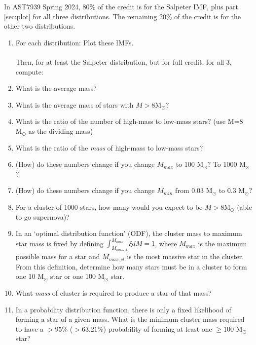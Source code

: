 \documentclass{article}
\newcommand{\msun}{\ensuremath{\mathrm{M}_\odot}\xspace}
\begin{document}
\begin{enumerate}
    In AST7939 Spring 2024, 80\% of the credit is for the Salpeter IMF, plus part \ref{sec:plot} for all three distributions.
    The remaining 20\% of the credit is for the other two distributions.

    \begin{enumerate}

        \item For each distribution: Plot these IMFs.
            \label{sec:plot}
            \\
            \\

            Then, for at least the Salpeter distribution, but for full credit, for all 3, compute:
        \item What is the average mass?
        \item What is the average mass of stars with $M>8\msun$?
        \item What is the ratio of the number of high-mass to low-mass stars?
            (use M=8 \msun as the dividing mass)
        \item What is the ratio of the \emph{mass} of high-mass to low-mass stars?
        \item (How) do these numbers change if you change $M_{max}$ to 100 \msun?  To 1000 \msun?
        \item (How) do these numbers change if you change $M_{min}$ from 0.03 \msun to 0.3 \msun?
        \item For a cluster of 1000 stars, how many would you expect to be
            $M>8\msun$ (able to go supernova)?
        \item In an `optimal distribution function' (ODF), the cluster mass to maximum star mass
            is fixed by defining $\int_{M_{max,cl}}^{M_{max}} \xi dM = 1$,
            where $M_{max}$ is the maximum possible mass for a star and $M_{max,cl}$ is
            the most massive star in the cluster.
            From this definition, determine how many stars must be in a cluster
            to form one 10 \msun star or one 100 \msun star.
        \item What \emph{mass} of cluster is required to produce a star of that mass?
        \item In a probability distribution function, there is only a fixed likelihood
            of forming a star of a given mass.  What is the minimum cluster mass
            required to have a $>95\%$ ($>63.21\%$) probability of forming at least one $\geq100$
            \msun star?\\

\end{enumerate}
\end{enumerate}
\end{document}

